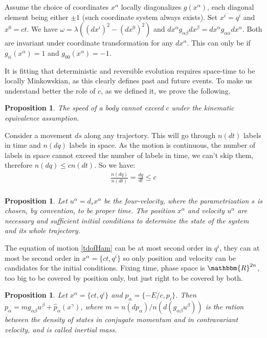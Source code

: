 \documentclass[aps,pra,10pt,twocolumn,floatfix,nofootinbib]{revtex4-1}
\newtheorem{prop}[thm]{Proposition}
\theoremstyle{definition}
\begin{document}
Assume the choice of coordinates $x^\alpha$ locally diagonalizes $g(x^\alpha)$, each diagonal element being either $\pm 1$ (such coordinate system always exists). Set $x^i=q^i$ and $x^0=ct$. We have $\omega = \lambda ((dx^i)^2 - (dx^0)^2)$ and $dx^\alpha g_{\alpha \beta} dx^\beta=dx^\alpha g_{\alpha \alpha}dx^\alpha$. Both are invariant under coordinate transformation for any $dx^\alpha$. This can only be if $g_{ii}(x^\alpha)=1$ and $g_{00}(x^\alpha)=-1$.

It is fitting that deterministic and reversible evolution requires space-time to be locally Minkowskian, as this clearly defines past and future events. To make us understand better the role of $c$, as we defined it, we prove the following.

\begin{prop}\label{locallyMinkowski}
The speed of a body cannot exceed $c$ under the kinematic equivalence assumption.
\end{prop}

Consider a movement $ds$ along any trajectory. This will go through $n(dt)$ labels in time and $n(dq)$ labels in space. As the motion is continuous, the number of labels in space cannot exceed the number of labels in time, we can't skip them, therefore $n(dq)\leq c n(dt)$. So we have:
\begin{align*}
\frac{n(dq)}{n(dt)}= \frac{dq}{dt} \leq c \\
\end{align*}

\begin{prop}\label{initialConditions}
Let $u^\alpha = d_s x^\alpha$ be the four-velocity, where the parametrization $s$ is chosen, by convention, to be proper time. The position $x^\alpha$ and velocity $u^\alpha$ are necessary and sufficient initial conditions to determine the state of the system and its whole trajectory.
\end{prop}

The equation of motion \ref{tdofHam} can be at most second order in $q^i$, they can at most be second order in $x^\alpha=\{ct, q^i\}$ so only position and velocity can be candidates for the initial conditions. Fixing time, phase space is $\mathbbm{R}^{2n}$, too big to be covered by position only, but just right to be covered by both.

\begin{prop}\label{kineticMomentum}
Let $x^\alpha=\{ct, q^i\}$ and $p_\alpha=\{-E/c, p_i\}$. Then $p_\alpha= m g_{\alpha \beta}u^\beta + \hat{p}_\alpha(x^\gamma)$, where $m=n(dp_\alpha)/n(d(g_{\alpha \beta}u^\beta))$ is the ration between the density of states in conjugate momentum and in contravariant velocity, and is called \emph{inertial mass}.
\end{prop}
\end{document}
